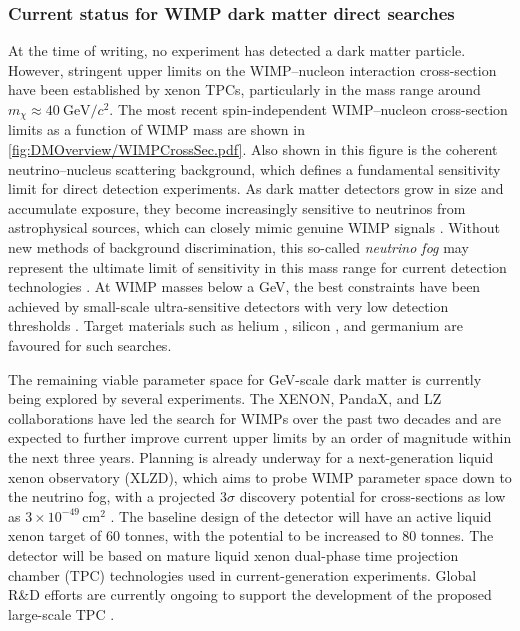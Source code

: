 \pagebreak

\subsubsection{Current status for WIMP dark matter direct searches}\label{sec:DMOverview/DMCurrentStatus}
At the time of writing, no experiment has detected a dark matter particle. However, stringent upper limits on the WIMP–nucleon interaction cross-section have been established by xenon TPCs, particularly in the mass range around $m_\chi \approx 40~\text{GeV}/c^2$. The most recent spin-independent WIMP–nucleon cross-section limits as a function of WIMP mass are shown in \autoref{fig:DMOverview/WIMPCrossSec.pdf}. Also shown in this figure is the coherent neutrino–nucleus scattering background, which defines a fundamental sensitivity limit for direct detection experiments. As dark matter detectors grow in size and accumulate exposure, they become increasingly sensitive to neutrinos from astrophysical sources, which can closely mimic genuine WIMP signals \cite{Billard:2013qya}. Without new methods of background discrimination, this so-called \textit{neutrino fog} may represent the ultimate limit of sensitivity in this mass range for current detection technologies \cite{Boehm:2018sux}. At WIMP masses below a GeV, the best constraints have been achieved by small-scale ultra-sensitive detectors with very low detection thresholds \cite{mwilliams:thesis}. Target materials such as helium \cite{SPICE:2023tru}, silicon \cite{TESSERACT:2025tfw,DAMIC:2020cut}, and germanium \cite{SuperCDMS:2017nns} are favoured for such searches.

The remaining viable parameter space for GeV-scale dark matter is currently being explored by several experiments. The XENON, PandaX, and LZ collaborations have led the search for WIMPs over the past two decades and are expected to further improve current upper limits by an order of magnitude within the next three years. Planning is already underway for a next-generation liquid xenon observatory (XLZD), which aims to probe WIMP parameter space down to the neutrino fog, with a projected $3\sigma$ discovery potential for cross-sections as low as $3\times10^{-49}\,\text{cm}^2$ \cite{XLZD:2024nsu}. The baseline design of the detector will have an active liquid xenon target of 60 tonnes, with the potential to be increased to 80 tonnes. The detector will be based on mature liquid xenon dual-phase time projection chamber (TPC) technologies used in current-generation experiments. Global R\&D efforts are currently ongoing to support the development of the proposed large-scale TPC \cite{Brown:2023vgf,Baudis:2023ywo}.

